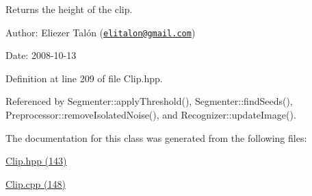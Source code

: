 Returns the height of the clip. 

\begin{Desc}
\item[Author:]Eliezer Talón (\href{mailto:elitalon@gmail.com}{\tt elitalon@gmail.com}) \end{Desc}
\begin{Desc}
\item[Date:]2008-10-13 \end{Desc}


Definition at line 209 of file Clip.hpp.

Referenced by Segmenter::applyThreshold(), Segmenter::findSeeds(), Preprocessor::removeIsolatedNoise(), and Recognizer::updateImage().

The documentation for this class was generated from the following files:\begin{CompactItemize}
\item 
\hyperlink{_clip_8hpp}{Clip.hpp (143)}\item 
\hyperlink{_clip_8cpp}{Clip.cpp (148)}\end{CompactItemize}
